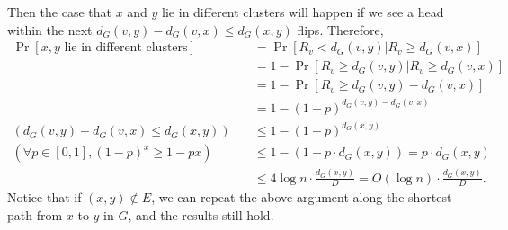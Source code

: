 \begin{answer}
\begin{enumerate}[label=\alph*).]
        Then the case that $x$ and $y$ lie in different clusters will happen if we see a head within the next $d_G(v,y) - d_G(v,x) \le d_G(x,y)$ flips. 
        Therefore, 
        \begin{align*}
            \Pr[x, y \text{ lie in different clusters}] &= \Pr[R_v < d_G(v,y) | R_v \ge d_G(v,x)] \\
            &= 1 - \Pr[R_v \ge d_G(v,y) | R_v \ge d_G(v,x)] \\
            &= 1 - \Pr[R_v \ge d_G(v,y)-d_G(v,x)] \\ 
            &= 1 - (1-p)^{d_G(v,y)-d_G(v,x)}  \\
            (d_G(v,y) - d_G(v,x) \le d_G(x,y))\quad&\le 1 - (1-p)^{d_G(x,y)} \\
            (\forall p \in [0,1],(1-p)^x \ge 1-px) \quad&\le 1 - ( 1 - p\cdot d_G(x,y)) = p\cdot d_G(x,y) \\
            &\le 4\log n \cdot \frac{d_G(x,y)}{D}  = O(\log n) \cdot \frac{d_G(x,y)}{D}.
        \end{align*}
        Notice that if $(x,y) \notin E$, we can repeat the above argument along the shortest path from $x$ to $y$ in $G$, and the results still hold.


\end{enumerate}
\end{answer}
